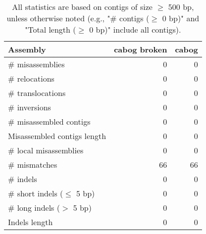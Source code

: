 \documentclass[12pt,a4paper]{article}
\begin{document}
\begin{table}[ht]
\begin{center}
\caption{All statistics are based on contigs of size $\geq$ 500 bp, unless otherwise noted (e.g., "\# contigs ($\geq$ 0 bp)" and "Total length ($\geq$ 0 bp)" include all contigs).}
\begin{tabular}{|l*{2}{|r}|}
\hline
Assembly & cabog broken & cabog \\ \hline
\# misassemblies & 0 & 0 \\ \hline
\hspace{5mm}\# relocations & 0 & 0 \\ \hline
\hspace{5mm}\# translocations & 0 & 0 \\ \hline
\hspace{5mm}\# inversions & 0 & 0 \\ \hline
\# misassembled contigs & 0 & 0 \\ \hline
Misassembled contigs length & 0 & 0 \\ \hline
\# local misassemblies & 0 & 0 \\ \hline
\# mismatches & 66 & 66 \\ \hline
\# indels & 0 & 0 \\ \hline
\hspace{5mm}\# short indels ($\leq$ 5 bp) & 0 & 0 \\ \hline
\hspace{5mm}\# long indels ($>$ 5 bp) & 0 & 0 \\ \hline
Indels length & 0 & 0 \\ \hline
\end{tabular}
\end{center}
\end{table}
\end{document}
